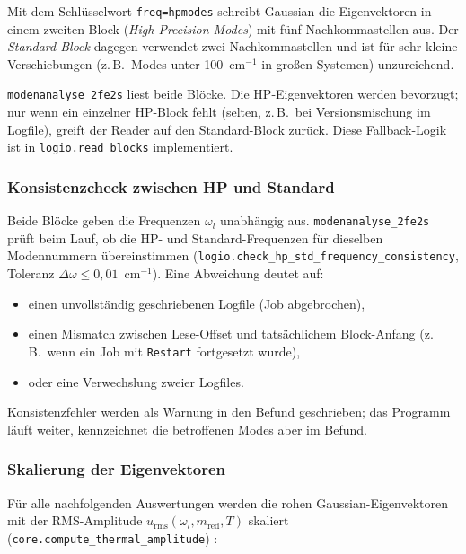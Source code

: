 \documentclass[11pt,a4paper,twoside]{article}
\newcommand{\urms}{u_{\mathrm{rms}}}
\theoremstyle{remark}
\begin{document}
Mit dem Schl\"usselwort \texttt{freq=hpmodes} schreibt Gaussian die
Eigenvektoren in einem zweiten Block (\emph{High-Precision Modes}) mit
f\"unf Nachkommastellen aus. Der \emph{Standard-Block} dagegen
verwendet zwei Nachkommastellen und ist f\"ur sehr kleine
Verschiebungen (z.\,B.\ Modes unter 100~cm$^{-1}$ in gro\ss en
Systemen) unzureichend.

\texttt{modenanalyse\_2fe2s} liest beide Bl\"ocke. Die HP-Eigenvektoren
werden bevorzugt; nur wenn ein einzelner HP-Block fehlt (selten, z.\,B.\
bei Versionsmischung im Logfile), greift der Reader auf den
Standard-Block zur\"uck. Diese Fallback-Logik ist in
\texttt{logio.read\_blocks} implementiert.

\subsubsection*{Konsistenzcheck zwischen HP und Standard}
\label{sec:hp-std-check}

Beide Bl\"ocke geben die Frequenzen $\omega_l$ unabh\"angig aus.
\texttt{modenanalyse\_2fe2s} pr\"uft beim Lauf, ob die HP- und
Standard-Frequenzen f\"ur dieselben Modennummern \"ubereinstimmen
(\texttt{logio.check\_hp\_std\_frequency\_consistency}, Toleranz
$\Delta\omega \leq 0{,}01$~cm$^{-1}$). Eine Abweichung deutet auf:

\begin{itemize}
  \item einen unvollst\"andig geschriebenen Logfile (Job abgebrochen),
  \item einen Mismatch zwischen Lese-Offset und tats\"achlichem
        Block-Anfang (z.\,B.\ wenn ein Job mit \texttt{Restart} fortgesetzt
        wurde),
  \item oder eine Verwechslung zweier Logfiles.
\end{itemize}

Konsistenzfehler werden als Warnung in den Befund geschrieben; das
Programm l\"auft weiter, kennzeichnet die betroffenen Modes aber im
Befund.

\subsubsection*{Skalierung der Eigenvektoren}

F\"ur alle nachfolgenden Auswertungen werden die rohen
Gaussian-Eigenvektoren mit der RMS-Amplitude
$\urms(\omega_l, m_{\mathrm{red}}, T)$ skaliert
(\texttt{core.compute\_thermal\_amplitude})
\cite{Achterhold2002,WilsonDeciusCross1955}:
\end{document}

